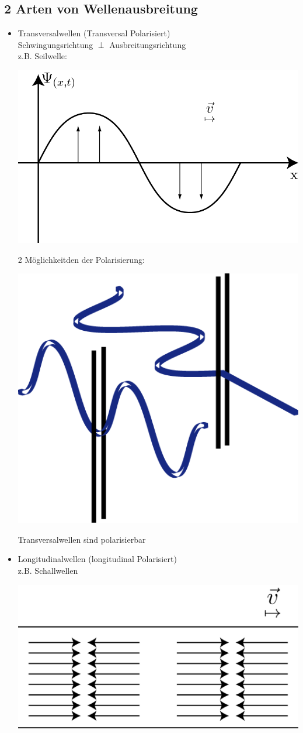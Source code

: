\subsection{2 Arten von Wellenausbreitung}
\begin{itemize}
	\item Transversalwellen (Transversal Polarisiert) \\
	Schwingungsrichtung $ \perp $ Ausbreitungsrichtung\\
	z.B. Seilwelle:
	\begin{center}
		\includegraphics[width=0.5\linewidth]{skizzen/19/19B04}
	\end{center}
	\begin{center}
		
		2 Möglichkeitden der Polarisierung:
		\begin{center}
			\includegraphics[width=0.5\linewidth]{skizzen/19/19B05}
		\end{center}
		Transversalwellen sind polarisierbar
	\end{center}
	\item Longitudinalwellen (longitudinal Polarisiert)\\
	z.B. Schallwellen
	\begin{center}
		\includegraphics[width=0.5\linewidth]{skizzen/19/19B06}
	\end{center}
\end{itemize}

